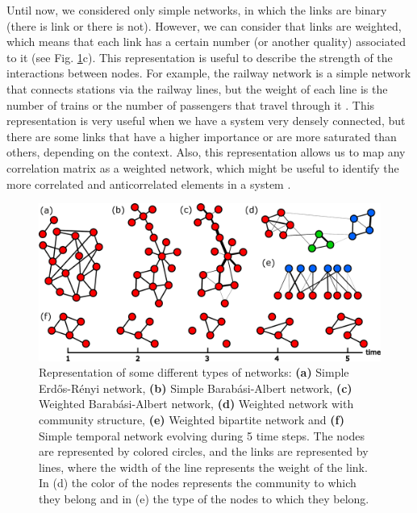Until now, we considered only simple networks, in which the links are binary (there is link or there is not). However, we can consider that links are weighted, which means that each link has a certain number (or another quality) associated to it \cite{barrat2004architecture} (see Fig. \ref{fig:netwotk_types}c). This representation is useful to describe the strength of the interactions between nodes. For example, the railway network is a simple network that connects stations via the railway lines, but the weight of each line is the number of trains or the number of passengers that travel through it \cite{latora-2002}. This representation is very useful when we have a system very densely connected, but there are some links that have a higher importance or are more saturated than others, depending on the context. Also, this representation allows us to map any correlation matrix as a weighted network, which might be useful to identify the more correlated and anticorrelated elements in a system \cite{onnela-2003,tumminello-2005}.

\begin{figure}
    \centering
    \includegraphics[width=\textwidth]{Figs/Introduction/network_plot.pdf}
    \caption[Different network types]{Representation of some different types of networks: \textbf{(a)} Simple Erd\H{o}s-R\'enyi network, \textbf{(b)} Simple Barab\'asi-Albert network, \textbf{(c)} Weighted Barab\'asi-Albert network, \textbf{(d)} Weighted network with community structure, \textbf{(e)} Weighted bipartite network and \textbf{(f)} Simple temporal network evolving during 5 time steps. The nodes are represented by colored circles, and the links are represented by lines, where the width of the line represents the weight of the link. In (d) the color of the nodes represents the community to which they belong and in (e) the type of the nodes to which they belong.}
    \label{fig:netwotk_types}
\end{figure}


